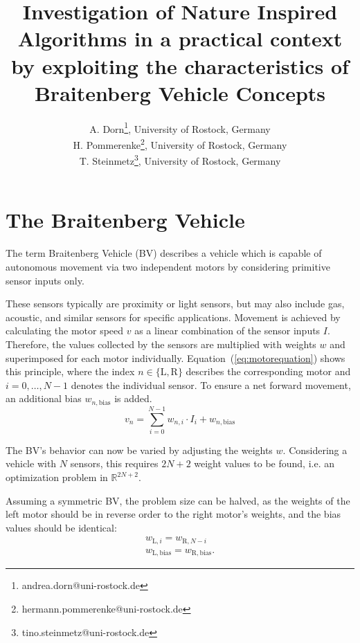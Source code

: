 \documentclass[a4paper]{jacow}
\begin{document}
\title{Investigation of Nature Inspired Algorithms in a practical context by exploiting the characteristics of Braitenberg Vehicle Concepts}

\author{A. Dorn\thanks{andrea.dorn@uni-rostock.de}, University of Rostock, Germany \\
		H. Pommerenke\thanks{hermann.pommerenke@uni-rostock.de}, University of Rostock, Germany \\
		T. Steinmetz\thanks{tino.steinmetz@uni-rostock.de}, University of Rostock, Germany}
	
\maketitle


\section{The Braitenberg Vehicle}

The term Braitenberg Vehicle (BV) describes a vehicle which is capable of autonomous movement via two independent motors by considering primitive sensor inputs only.

These sensors typically are proximity or light sensors, but may also include gas, acoustic, and similar sensors for specific applications. Movement is achieved by calculating the motor speed $v$ as a linear combination of the sensor inputs $I$. Therefore, the values collected by the sensors are multiplied with weights $w$ and superimposed for each motor individually. Equation~(\ref{eq:motorequation}) shows this principle, where the index $n\in\{\mathrm{L},\mathrm{R}\}$ describes the corresponding motor and $i=0,\ldots,N-1$ denotes the individual sensor. To ensure a net forward movement, an additional bias $w_{n,\text{bias}}$ is added.
\begin{equation}
	v_{n} = \sum\limits_{i=0}^{N-1} w_{n,i}\cdot I_{i} + w_{n,\text{bias}}
	\label{eq:motorequation}
\end{equation}

The BV's behavior can now be varied by adjusting the weights $w$. Considering a vehicle with $N$ sensors, this requires $2N+2$ weight values to be found, i.e. an optimization problem in $\mathbb{R}^{2N+2}$.

Assuming a symmetric BV, the problem size can be halved, as the weights of the left motor should be in reverse order to the right motor's weights, and the bias values should be identical:
\begin{align}
	w_{\mathrm{L}, i} = w_{\mathrm{R}, N-i} \nonumber \\
	w_{\mathrm{L},\text{bias}} = w_{\mathrm{R},\text{bias}}.\label{eq:symmetry}
\end{align}
\end{document}
